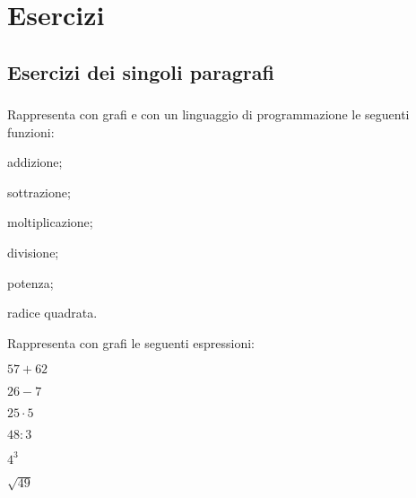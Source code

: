 
\section{Esercizi}

\subsection{Esercizi dei singoli paragrafi}

\subsubsection*{}

\begin{esercizio}
Rappresenta con grafi e con un linguaggio di programmazione le seguenti
funzioni:
\begin{multicols}{3}
 \begin{enumeratea}
 \item addizione;
 \item sottrazione;
 \item moltiplicazione;
 \item divisione;
 \item potenza;
 \item radice quadrata.
 \end{enumeratea}
\end{multicols}
\end{esercizio}

\begin{esercizio}
Rappresenta con grafi le seguenti espressioni:
\begin{multicols}{3}
 \begin{enumeratea}
 \item \(57 + 62\)
 \item \(26 - 7\)
 \item \(25 \cdot 5\)
 \item \(48 : 3\)
 \item \(4^3\)
 \item \(\sqrt{49}\)
 \end{enumeratea}
\end{multicols}
\end{esercizio}


